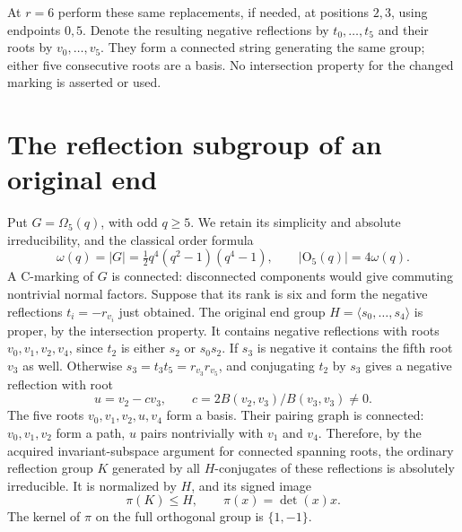 \documentclass[11pt,a4paper]{article}
\newcommand{\gen}[1]{\langle#1\rangle}\newcommand{\Om}{\Omega}
\begin{document}
At $r=6$ perform these same replacements, if needed, at positions
$2,3$, using endpoints $0,5$. Denote the resulting negative
reflections by $t_0,\ldots,t_5$ and their roots by $v_0,\ldots,v_5$.
They form a connected string generating the same group; either five
consecutive roots are a basis. No intersection property for the changed
marking is asserted or used.


\section{The reflection subgroup of an original end}
Put $G=\Om_5(q)$, with odd $q\ge5$. We retain its simplicity and
absolute irreducibility, and the classical order formula
\[
 \omega(q)=|G|=\tfrac12q^4(q^2-1)(q^4-1),
 \qquad |\mathrm O_5(q)|=4\omega(q).                    \tag{4}
\]
A C-marking of $G$ is connected: disconnected components would give
commuting nontrivial normal factors. Suppose that its rank is six and
form the negative reflections $t_i=-r_{v_i}$ just obtained.
The original end group $H=\gen{s_0,\ldots,s_4}$ is proper, by the
intersection property. It contains negative reflections with roots
$v_0,v_1,v_2,v_4$, since $t_2$ is either $s_2$ or $s_0s_2$.
If $s_3$ is negative it contains the fifth root $v_3$ as well.
Otherwise $s_3=t_3t_5=r_{v_3}r_{v_5}$, and conjugating $t_2$ by
$s_3$ gives a negative reflection with root
\[
                 u=v_2-cv_3,\qquad
                 c=2B(v_2,v_3)/B(v_3,v_3)\ne0.          \tag{5}
\]
The five roots $v_0,v_1,v_2,u,v_4$ form a basis. Their pairing graph
is connected: $v_0,v_1,v_2$ form a path, $u$ pairs nontrivially with
$v_1$ and $v_4$. Therefore, by the acquired invariant-subspace
argument for connected spanning roots, the ordinary reflection group
$K$ generated by all $H$-conjugates of these reflections is absolutely
irreducible. It is normalized by $H$, and its signed image
\[
 \pi(K)\le H,\qquad \pi(x)=\det(x)x.                  \tag{6}
\]
The kernel of $\pi$ on the full orthogonal group is $\{1,-1\}$.
\end{document}
